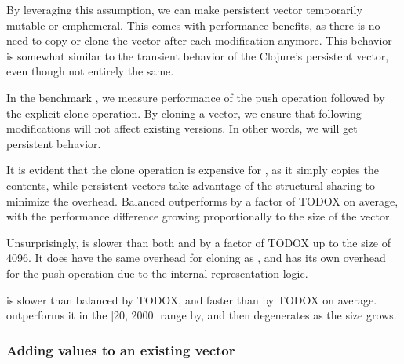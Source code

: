 By leveraging this assumption, we can make persistent vector temporarily mutable or emphemeral. This comes with performance benefits, as there is no need to copy or clone the vector after each modification anymore. This behavior is somewhat similar to the transient behavior of the Clojure's persistent vector, even though not entirely the same. 

In the benchmark , we measure performance of the push operation followed by the explicit clone operation. By cloning a vector, we ensure that following modifications will not affect existing versions. In other words, we will get persistent behavior. 

It is evident that the clone operation is expensive for \stdvec{}, as it simply copies the contents, while persistent vectors take advantage of the structural sharing to minimize the overhead. Balanced \rrbvec{} outperforms \stdvec{} by a factor of TODOX on average, with the performance difference growing proportionally to the size of the vector. 

Unsurprisingly, \pvec{} is slower than both \stdvec{} and \rrbvec{} by a factor of TODOX up to the size of 4096. It does have the same overhead for cloning as \stdvec{}, and has its own overhead for the push operation due to the internal representation logic. 

\imrsvec{} is slower than balanced \rrbvec{} by TODOX, and faster than \pvec{} by TODOX on average. \stdvec{} outperforms it in the [20, 2000] range by, and then degenerates as the size grows. 

\subsubsection*{Adding values to an existing vector}

